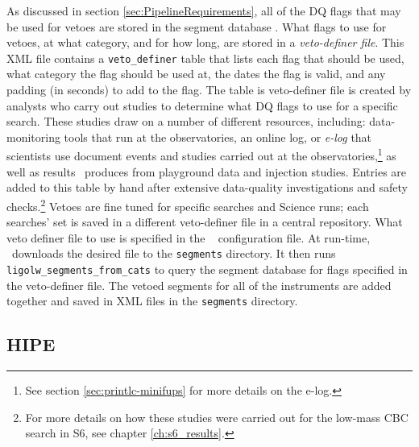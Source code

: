 As discussed in section \ref{sec:PipelineRequirements}, all of the \ac{DQ}
flags that may be used for vetoes are stored in the segment database
\cite{BPP:segdb}. What flags to use for vetoes, at what category, and for how
long, are stored in a \emph{veto-definer file}. This XML file contains a
\texttt{veto\_definer} table that lists each flag that should be used, what
category the flag should be used at, the dates the flag is valid, and any
padding (in seconds) to add to the flag. The table is veto-definer file is
created by analysts who carry out studies to determine what \ac{DQ} flags to
use for a specific search. These studies draw on a number of different
resources, including: data-monitoring tools that run at the observatories, an
online log, or \emph{e-log} that scientists use document events and studies
carried out at the observatories,\footnote{See section \ref{sec:printlc-minifups} for
more details on the e-log.} as well as results \ihope~produces from playground
data and injection studies. Entries are added to this table by hand after
extensive data-quality investigations and safety checks.\footnote{For more
details on how these studies were carried out for the low-mass \ac{CBC} search
in \ac{S6}, see chapter \ref{ch:s6_results}.} Vetoes are fine tuned for
specific searches and Science runs; each searches' set is saved in a different
veto-definer file in a central repository. What veto definer file to use is
specified in the \ihope~ configuration file. At run-time, \ihope~downloads the
desired file to the \texttt{segments} directory. It then runs
\texttt{ligolw\_segments\_from\_cats} \cite{BPP:segdb} to query the segment
database for flags specified in the veto-definer file. The vetoed segments for
all of the instruments are added together and saved in XML files in the
\texttt{segments} directory.


\subsection{HIPE}
\label{sec:hipe_overview}

